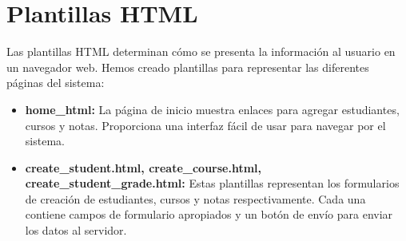 \documentclass[10pt, a4paper]{article}
\begin{document}
\section{Plantillas HTML}
Las plantillas HTML determinan cómo se presenta la información al usuario en un navegador web. Hemos creado plantillas para representar las diferentes páginas del sistema:

\begin{itemize}
  \item \textbf{home\_html:} La página de inicio muestra enlaces para agregar estudiantes, cursos y notas. Proporciona una interfaz fácil de usar para navegar por el sistema.

  \item \textbf{create\_student.html, create\_course.html, create\_student\_grade.html:} Estas plantillas representan los formularios de creación de estudiantes, cursos y notas respectivamente. Cada una contiene campos de formulario apropiados y un botón de envío para enviar los datos al servidor.

\end{itemize}
\end{document}
